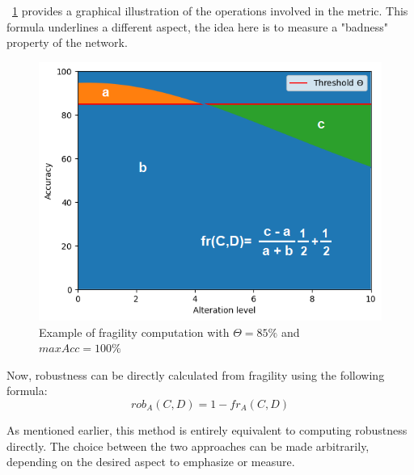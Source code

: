 \Fig~\ref{fig:frag_example} provides a graphical illustration of the operations involved in the metric. This formula underlines a different aspect, the idea here is to measure a "badness" property of the network.

\begin{figure}[h]
	\centering
	\includegraphics[width=0.7\linewidth]{ImageFiles/ANNRob/frag_example}
	\caption{Example of fragility computation with $\Theta=85\%$ and $maxAcc = 100\%$}
	\label{fig:frag_example}
\end{figure}

Now, robustness can be directly calculated from fragility using the following formula:
\[
	rob_A(C,D) = 1 - fr_A(C,D)
\]

As mentioned earlier, this method is entirely equivalent to computing robustness directly. The choice between the two approaches can be made arbitrarily, depending on the desired aspect to emphasize or measure.

